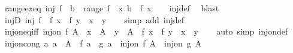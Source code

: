 \begin{isabellebody}
\isamarkupfalse%
\ range{\isacharunderscore}{\kern0pt}ex{}{\isacharunderscore}{\kern0pt}eq{\isacharcolon}{\kern0pt}\ {\isachardoublequoteopen}inj\ f\ {\isasymLongrightarrow}\ b\ {\isasymin}\ range\ f\ {\isasymlongleftrightarrow}\ {\isacharparenleft}{\kern0pt}{\isasymexists}{\isacharbang}{\kern0pt}x{\isachardot}{\kern0pt}\ b\ {\isacharequal}{\kern0pt}\ f\ x{\isacharparenright}{\kern0pt}{\isachardoublequoteclose}\isanewline
%
\isadelimproof
\ \ %
\endisadelimproof
%
\isatagproof
{}\isamarkupfalse%
\ inj{\isacharunderscore}{\kern0pt}def\ \isamarkupfalse%
\ blast%
\endisatagproof
{\isafoldproof}%
%
\isadelimproof
\isanewline
%
\endisadelimproof
\isanewline
{}\isamarkupfalse%
\ injD{\isacharcolon}{\kern0pt}\ {\isachardoublequoteopen}inj\ f\ {\isasymLongrightarrow}\ f\ x\ {\isacharequal}{\kern0pt}\ f\ y\ {\isasymLongrightarrow}\ x\ {\isacharequal}{\kern0pt}\ y{\isachardoublequoteclose}\isanewline
%
\isadelimproof
\ \ %
\endisadelimproof
%
\isatagproof
{}\isamarkupfalse%
\ {\isacharparenleft}{\kern0pt}simp\ add{\isacharcolon}{\kern0pt}\ inj{\isacharunderscore}{\kern0pt}def{\isacharparenright}{\kern0pt}%
\endisatagproof
{\isafoldproof}%
%
\isadelimproof
\isanewline
%
\endisadelimproof
\isanewline
{}\isamarkupfalse%
\ inj{\isacharunderscore}{\kern0pt}on{\isacharunderscore}{\kern0pt}eq{\isacharunderscore}{\kern0pt}iff{\isacharcolon}{\kern0pt}\ {\isachardoublequoteopen}inj{\isacharunderscore}{\kern0pt}on\ f\ A\ {\isasymLongrightarrow}\ x\ {\isasymin}\ A\ {\isasymLongrightarrow}\ y\ {\isasymin}\ A\ {\isasymLongrightarrow}\ f\ x\ {\isacharequal}{\kern0pt}\ f\ y\ {\isasymlongleftrightarrow}\ x\ {\isacharequal}{\kern0pt}\ y{\isachardoublequoteclose}\isanewline
%
\isadelimproof
\ \ %
\endisadelimproof
%
\isatagproof
{}\isamarkupfalse%
\ {\isacharparenleft}{\kern0pt}auto\ simp{\isacharcolon}{\kern0pt}\ inj{\isacharunderscore}{\kern0pt}on{\isacharunderscore}{\kern0pt}def{\isacharparenright}{\kern0pt}%
\endisatagproof
{\isafoldproof}%
%
\isadelimproof
\isanewline
%
\endisadelimproof
\isanewline
{}\isamarkupfalse%
\ inj{\isacharunderscore}{\kern0pt}on{\isacharunderscore}{\kern0pt}cong{\isacharcolon}{\kern0pt}\ {\isachardoublequoteopen}{\isacharparenleft}{\kern0pt}{\isasymAnd}a{\isachardot}{\kern0pt}\ a\ {\isasymin}\ A\ {\isasymLongrightarrow}\ f\ a\ {\isacharequal}{\kern0pt}\ g\ a{\isacharparenright}{\kern0pt}\ {\isasymLongrightarrow}\ inj{\isacharunderscore}{\kern0pt}on\ f\ A\ {\isasymlongleftrightarrow}\ inj{\isacharunderscore}{\kern0pt}on\ g\ A{\isachardoublequoteclose}\isanewline

\end{isabellebody}
